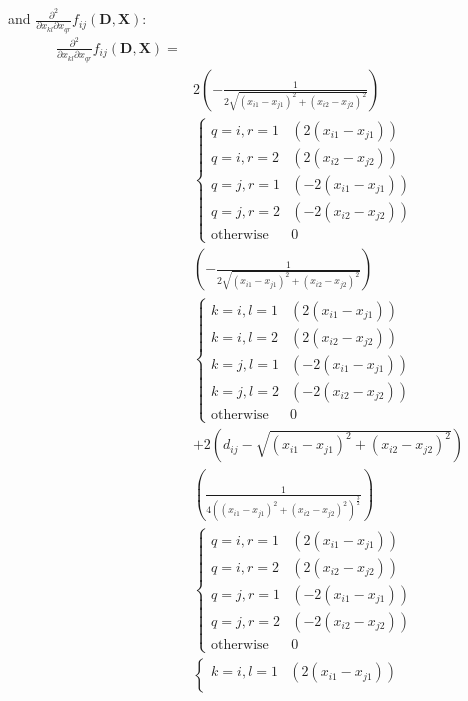 \documentclass[a4paper,12pt]{article}
\begin{document}
and $\frac{\partial^2}{\partial x_{kl} \partial x_{qr}} f_{ij}(\bm{D}, \bm{X})$:
\begin{equation}
\begin{aligned}
    \frac{\partial^2}{\partial x_{kl} \partial x_{qr}} f_{ij}(\bm{D}, \bm{X}) = 
    \\ & 2\left(- \frac{1}{2\sqrt{(x_{i1} - x_{j1})^2 + (x_{i2} - x_{j2})^2}} \right)
    \\ &\begin{cases}
        q=i,r=1 & \left(2(x_{i1} - x_{j1})\right)\\
        q=i,r=2 & \left(2(x_{i2} - x_{j2})\right)\\
        q=j,r=1 & \left(-2(x_{i1} - x_{j1})\right)\\
        q=j,r=2 & \left(-2(x_{i2} - x_{j2})\right)\\
        \text{otherwise} & 0
    \end{cases}
    \\ & \left(-\frac{1}{2\sqrt{(x_{i1} - x_{j1})^2 + (x_{i2} - x_{j2})^2}} \right) 
    \\ &\begin{cases}
        k=i,l=1 & \left(2(x_{i1} - x_{j1})\right)\\
        k=i,l=2 & \left(2(x_{i2} - x_{j2})\right)\\
        k=j,l=1 & \left(-2(x_{i1} - x_{j1})\right)\\
        k=j,l=2 & \left(-2(x_{i2} - x_{j2})\right)\\
        \text{otherwise} & 0
    \end{cases}    
    \\ & + 2\left(d_{ij} - \sqrt{(x_{i1} - x_{j1})^2 + (x_{i2} - x_{j2})^2} \right)
    \\ & \left(\frac{1}{4\left((x_{i1} - x_{j1})^2 + (x_{i2} - x_{j2})^2\right)^{\frac{3}{2}}} \right) 
    \\ & \begin{cases}
        q=i,r=1 & \left(2(x_{i1} - x_{j1})\right)\\
        q=i,r=2 & \left(2(x_{i2} - x_{j2})\right)\\
        q=j,r=1 & \left(-2(x_{i1} - x_{j1})\right)\\
        q=j,r=2 & \left(-2(x_{i2} - x_{j2})\right)\\
        \text{otherwise} & 0
    \end{cases}
    \\ & \begin{cases}
        k=i,l=1 & \left(2(x_{i1} - x_{j1})\right)\\

\end{cases}
\end{aligned}
\end{equation}
\end{document}
